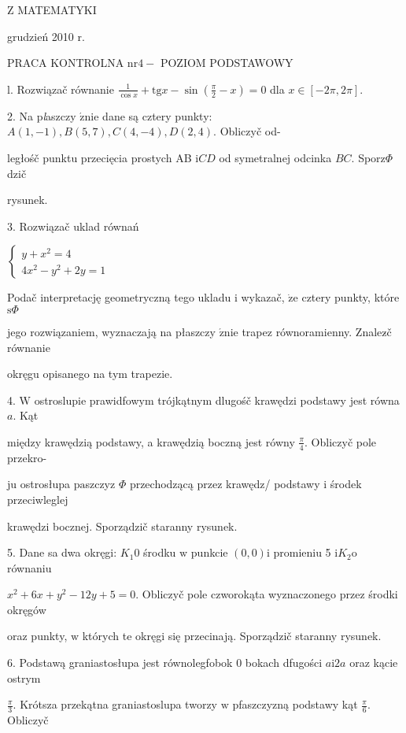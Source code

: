 \documentclass[a4paper,12pt]{article}
\begin{document}
Z MATEMATYKI

grudzień 2010 r.

PRACA KONTROLNA $\mathrm{n}\mathrm{r} 4-$ POZIOM PODSTAWOWY

l. Rozwiązač równanie $\displaystyle \frac{1}{\cos x}+\mathrm{t}\mathrm{g}x-\sin(\frac{\pi}{2}-x)=0$ dla $x\in[-2\pi,2\pi].$

2. Na p{\it l}aszczy $\acute{\mathrm{z}}\mathrm{n}\mathrm{i}\mathrm{e}$ dane są cztery punkty: $A(1,-1), B(5,7), C(4,-4), D(2,4)$. Obliczyč od-

ległośč punktu przecięcia prostych AB $\mathrm{i}CD$ od symetralnej odcinka $BC$. Sporz$\Phi$dzič

rysunek.

3. Rozwiązač uklad równań

$\left\{\begin{array}{l}
y+x^{2}=4\\
4x^{2}-y^{2}+2y=1
\end{array}\right.$

Podač interpretację geometryczną tego ukladu $\mathrm{i}$ wykazač, $\dot{\mathrm{z}}\mathrm{e}$ cztery punkty, które $\mathrm{s}\Phi$

jego rozwiązaniem, wyznaczają na płaszczy $\acute{\mathrm{z}}\mathrm{n}\mathrm{i}\mathrm{e}$ trapez równoramienny. Znalez$\acute{}$č równanie

okręgu opisanego na tym trapezie.

4. $\mathrm{W}$ ostroslupie prawidfowym trójkątnym dlugośč krawędzi podstawy jest równa $a$. Kąt

między krawędzią podstawy, a krawędzią boczną jest równy $\displaystyle \frac{\pi}{4}$. Obliczyč pole przekro-

ju ostrosłupa $\mathrm{p}\mathrm{a}$szczyz $\Phi$ przechodzącą przez krawędz/ podstawy $\mathrm{i}$ środek przeciwleglej

krawędzi bocznej. Sporządzič staranny rysunek.

5. Dane sa dwa okręgi: $K_{1}0$ środku $\mathrm{w}$ punkcie $(0,0)\mathrm{i}$ promieniu 5 $\mathrm{i}K_{2}\mathrm{o}$ równaniu

$x^{2}+6x+y^{2}-12y+5=0$. Obliczyč pole czworokąta wyznaczonego przez środki okręgów

oraz punkty, $\mathrm{w}$ których te okręgi się przecinają. Sporządzič staranny rysunek.

6. Podstawą graniastosłupa jest równolegfobok $0$ bokach dfugości $a\mathrm{i}2a$ oraz kącie ostrym

$\displaystyle \frac{\pi}{3}$. Krótsza przekątna graniastoslupa tworzy $\mathrm{w}$ pfaszczyzną podstawy kąt $\displaystyle \frac{\pi}{6}$. Obliczyč
\end{document}
